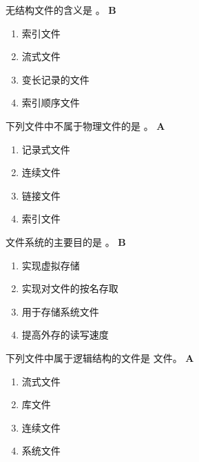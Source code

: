 \begin{problem}
	无结构文件的含义是 \myline。
	\textbf{B}
	\vspace{-0.5em}
	\begin{multicols}{4}
		\begin{enumerate}[label=\Alph*.]
			\item 索引文件
			\item 流式文件
			\item 变长记录的文件
			\item 索引顺序文件
		\end{enumerate}
	\end{multicols}
	\vspace{-1em}
\end{problem}


\begin{problem}
	下列文件中不属于物理文件的是 \myline。
	\textbf{A}
	\vspace{-0.5em}
	\begin{multicols}{4}
		\begin{enumerate}[label=\Alph*.]
			\item 记录式文件
			\item 连续文件
			\item 链接文件
			\item 索引文件
		\end{enumerate}
	\end{multicols}
	\vspace{-1em}
\end{problem}


\begin{problem}
	文件系统的主要目的是 \myline。
	\textbf{B}
	\vspace{-0.5em}
	\begin{multicols}{2}
		\begin{enumerate}[label=\Alph*.]
			\item 实现虚拟存储
			\item 实现对文件的按名存取
			\item 用于存储系统文件
			\item 提高外存的读写速度
		\end{enumerate}
	\end{multicols}
	\vspace{-1em}
\end{problem}


\begin{problem}
	下列文件中属于逻辑结构的文件是 \myline 文件。
	\textbf{A}
	\vspace{-0.5em}
	\begin{multicols}{4}
		\begin{enumerate}[label=\Alph*.]
			\item 流式文件
			\item 库文件
			\item 连续文件
			\item 系统文件
		\end{enumerate}
	\end{multicols}
	\vspace{-1em}
\end{problem}


